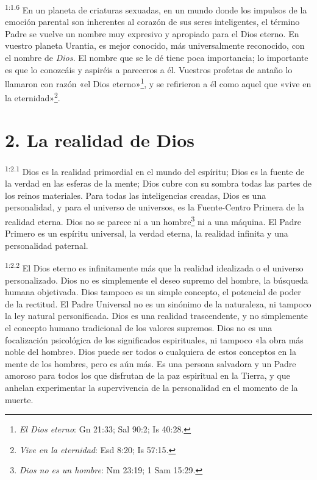 \par
\textsuperscript{1:1.6} En un planeta de criaturas sexuadas, en un mundo donde los impulsos de la emoción parental son inherentes al corazón de sus seres inteligentes, el término Padre se vuelve un nombre muy expresivo y apropiado para el Dios eterno. En vuestro planeta Urantia, es mejor conocido, más universalmente reconocido, con el nombre de \textit{Dios.} El nombre que se le dé tiene poca importancia; lo importante es que lo conozcáis y aspiréis a pareceros a él. Vuestros profetas de antaño lo llamaron con razón «el Dios eterno»\footnote{\textit{El Dios eterno}: Gn 21:33; Sal 90:2; Is 40:28.}, y se refirieron a él como aquel que «vive en la eternidad»\footnote{\textit{Vive en la eternidad}: Esd 8:20; Is 57:15.}.

\section*{2. La realidad de Dios}
\par
\textsuperscript{1:2.1} Dios es la realidad primordial en el mundo del espíritu; Dios es la fuente de la verdad en las esferas de la mente; Dios cubre con su sombra todas las partes de los reinos materiales. Para todas las inteligencias creadas, Dios es una personalidad, y para el universo de universos, es la Fuente-Centro Primera de la realidad eterna. Dios no se parece ni a un hombre\footnote{\textit{Dios no es un hombre}: Nm 23:19; 1 Sam 15:29.} ni a una máquina. El Padre Primero es un espíritu universal, la verdad eterna, la realidad infinita y una personalidad paternal.

\par
\textsuperscript{1:2.2} El Dios eterno es infinitamente más que la realidad idealizada o el universo personalizado. Dios no es simplemente el deseo supremo del hombre, la búsqueda humana objetivada. Dios tampoco es un simple concepto, el potencial de poder de la rectitud. El Padre Universal no es un sinónimo de la naturaleza, ni tampoco la ley natural personificada. Dios es una realidad trascendente, y no simplemente el concepto humano tradicional de los valores supremos. Dios no es una focalización psicológica de los significados espirituales, ni tampoco «la obra más noble del hombre». Dios puede ser todos o cualquiera de estos conceptos en la mente de los hombres, pero es aún más. Es una persona salvadora y un Padre amoroso para todos los que disfrutan de la paz espiritual en la Tierra, y que anhelan experimentar la supervivencia de la personalidad en el momento de la muerte.

